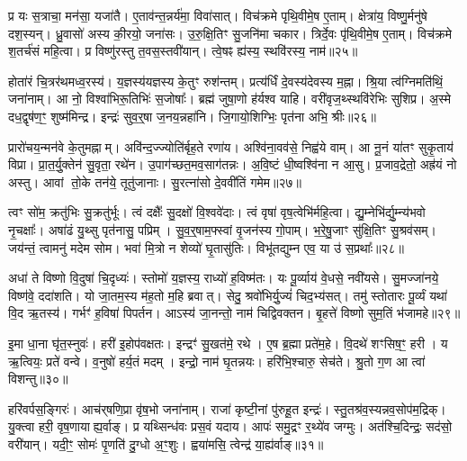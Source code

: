 प्र यः स॒त्राचा॒ मन॑सा॒ यजा॑तै।
ए॒ताव॑न्त॒न्नर्य॑मा॒ विवा॑सात्।
विच॑क्रमे पृथि॒वीमे॒ष ए॒ताम्।
क्षेत्रा॑य॒ विष्णु॒र्मनु॑षे दश॒स्यन्।
ध्रु॒वासो॑ अस्य की॒रयो॒ जना॑सः।
उ॒रु॒क्षि॒तिꣳ सु॒जनि॑मा चकार।
त्रिर्दे॒वः पृ॑थि॒वीमे॒ष ए॒ताम्।
विच॑क्रमे श॒तर्च॑सं महि॒त्वा।
प्र विष्णु॑रस्तु त॒वस॒स्तवी॑यान्।
त्वे॒षꣴ ह्य॑स्य॒ स्थवि॑रस्य॒ नाम॑॥२५॥

होता॑रं चि॒त्रर॑थमध्व॒रस्य॑।
य॒ज्ञस्य॑यज्ञस्य के॒तुꣳ रुश॑न्तम्।
प्रत्य॑र्धिं दे॒वस्य॑देवस्य म॒ह्ना।
श्रि॒या त्व॑ग्निमति॑थिं॒ जना॑नाम्।
आ नो॒ विश्वा॑भिरू॒तिभिः॑ स॒जोषाः᳚।
ब्रह्म॑ जुषा॒णो ह॑र्यश्व याहि।
वरी॑वृज॒थ्स्थवि॑रेभिः सुशिप्र।
अ॒स्मे दध॒द्वृष॑ण॒ꣳ॒ शुष्म॑मिन्द्र।
इन्द्रः॑ सुव॒र्॒षा ज॒नय॒न्नहा॑नि।
जि॒गायो॒शिग्भिः॒ पृत॑ना अभि॒ श्रीः॥२६॥

प्रारो॑चय॒न्मन॑वे के॒तुमह्नाम्।
अवि॑न्द॒ज्ज्योति॑र्बृह॒ते रणा॑य।
अश्वि॑ना॒वव॑से॒ निह्व॑ये वाम्।
आ नू॒नं या॑तꣳ सुकृ॒ताय॑ विप्रा।
प्रा॒त॒र्यु॒क्तेन॑ सु॒वृता॒ रथे॑न।
उ॒पाग॑च्छत॒मव॒साग॑तन्नः।
अ॒वि॒ष्टं धी॒ष्वश्वि॑ना न आ॒सु।
प्र॒जाव॒द्रेतो॒ अह्र॑यं नो अस्तु।
आवां तो॒के तन॑ये॒ तूतु॑जानाः।
सु॒रत्ना॑सो दे॒ववी॑तिं गमेम॥२७॥

त्वꣳ सो॑म॒ क्रतु॑भिः सु॒क्रतु॑र्भूः।
त्वं दक्षैः᳚ सु॒दक्षो॑ वि॒श्ववे॑दाः।
त्वं वृषा॑ वृष॒त्वेभि॑र्महि॒त्वा।
द्यु॒म्नेभि॑र्द्यु॒म्न्य॑भवो नृ॒चक्षाः᳚।
अषा॑ढं यु॒थ्सु पृत॑नासु॒ पप्रिम्।
सु॒व॒र्॒षाम॒फ्स्वां वृ॒जन॑स्य गो॒पाम्।
भ॒रे॒षु॒जाꣳ सु॑क्षि॒तिꣳ सु॒श्रव॑सम्।
जय॑न्तं॒ त्वामनु॑ मदेम सोम।
भवा॑ मि॒त्रो न शेव्यो॑ घृ॒तासु॑तिः।
विभू॑तद्युम्न एव॒ या उ॑ स॒प्रथाः᳚॥२८॥

अधा॑ ते विष्णो वि॒दुषा॑ चि॒दृध्यः॑।
स्तोमो॑ य॒ज्ञस्य॒ राध्यो॑ ह॒विष्म॑तः।
यः पू॒र्व्याय॑ वे॒धसे॒ नवी॑यसे।
सु॒मज्जा॑नये॒ विष्ण॑वे॒ ददा॑शति।
यो जा॒तम॒स्य म॑ह॒तो म॒हि ब्रवात्।
सेदु॒ श्रवो॑भिर्यु॒ज्यं॑         चिद॒भ्य॑सत्।
तमु॑ स्तोतारः पू॒र्व्यं यथा॑ वि॒द ऋ॒तस्य॑।
गर्भꣳ॑ ह॒विषा॑ पिपर्तन।
आऽस्य॑ जा॒नन्तो॒ नाम॑ चिद्विवक्तन।
बृ॒हत्ते॑ विष्णो सुम॒तिं भ॑जामहे॥२९॥

इ॒मा धा॒ना घृ॑त॒स्नुवः॑।
हरी॑ इ॒होप॑वक्षतः।
इन्द्रꣳ॑ सु॒खत॑मे॒ रथे।
ए॒ष ब्र॒ह्मा प्रते॑म॒हे।
वि॒दथे॑ शꣳसिष॒ꣳ॒ हरी।
य ऋ॒त्वियः॒ प्रते॑ वन्वे।
व॒नुषो॑ हर्य॒तं मदम्।
इन्द्रो॒ नाम॑ घृ॒तन्नयः।
हरि॑भि॒श्चारु॒ सेच॑ते।
श्रु॒तो ग॒ण आ त्वा॑ विशन्तु॥३०॥

हरि॑वर्पस॒ङ्गिरः॑।
आच॑र्‌\mbox{}षणि॒प्रा वृ॑ष॒भो जना॑नाम्।
राजा॑ कृष्टी॒नां पु॑रुहू॒त इन्द्रः॑।
स्तु॒तश्र॑व॒स्यन्नव॒सोप॑म॒द्रिक्।
यु॒क्त्वा हरी॒ वृष॒णायाह्य॒र्वाङ्।
प्र यथ्सिन्ध॑वः प्रस॒वं यदाय\sn{}।
आपः॑ समु॒द्रꣳ र॒थ्ये॑व जग्मुः।
अत॑श्चि॒दिन्द्रः॒ सद॑सो॒ वरी॑यान्।
यदी॒ꣳ॒ सोमः॑ पृ॒णति॑ दु॒ग्धो अ॒ꣳ॒शुः।
ह्वया॑मसि॒ त्वेन्द्र॑ या॒ह्य॑र्वाङ्॥३१॥

